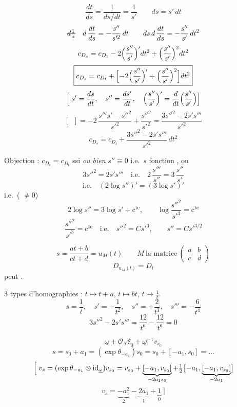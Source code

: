 \documentclass[11pt,a4paper]{article}
\begin{document}
\[
\frac{dt}{ds}=\frac{1}{ds/dt}=\frac{1}{s'} \qquad ds=s'\,dt
\]
\[
\text{\struck{$d\frac{1}{s}$}}\quad d\,\frac{dt}{ds}=-\frac{s''}{s'^2}\,dt
\qquad ds\,d\,\frac{dt}{ds}=-\frac{s''}{s'}\,dt^2
\]
\[
c_{D_s}=c_{D_t}-2\Bigl(\frac{s''}{s'}\Bigr)'dt^2+\Bigl(\frac{s''}{s'}\Bigr)^2dt^2
\]
\[
\boxed{c_{D_s}=c_{D_t}+\Bigl[-2\Bigl(\frac{s''}{s'}\Bigr)'+\Bigl(\frac{s''}{s'}\Bigr)^2\Bigr]dt^2}
\]
\[
\Bigl[\;s'=\frac{ds}{dt},\quad s''=\frac{ds'}{dt},\quad \Bigl(\frac{s''}{s'}\Bigr)'=\frac{d}{dt}\Bigl(\frac{s''}{s'}\Bigr)\Bigr]
\]
\[
[\;\;]=-2\,\frac{s'''s'-s''^2}{s'^2}+\frac{s''^2}{s'^2}=\frac{3s''^2-2s's'''}{s'^2}
\]
\[
\boxed{c_{D_s}=c_{D_t}+\frac{3s''^2-2s's'''}{s'^2}\,dt^2}
\]

Objection : $c_{D_s}=c_{D_t}$ ssi \emph{ou bien} $s''\equiv0$ i.e.\ $s$ fonction \ill{} , ou
\[
3s''^2=2s's'''\quad\text{i.e.}\quad 2\,\frac{s'''}{s''}=3\,\frac{s''}{s'}
\]
\[
\text{i.e.}\quad (2\log s'')'=(3\log s')'
\]
i.e.\ ( $\neq0$)
\[
2\log s''=3\log s'+\mathrm{c}^{\mathrm{te}},\qquad \log\frac{s''^2}{s'^3}=\mathrm{c}^{\mathrm{te}}
\]
\[
\frac{s''^2}{s'^3}=\mathrm{c}^{\mathrm{te}}\quad\text{i.e.}\quad s''^2=Cs'^3,\qquad s''=Cs'^{3/2}
\]

\[
s=\frac{at+b}{ct+d}=u_M(t)\qquad M\ \text{la matrice}\ \begin{pmatrix}a&b\\c&d\end{pmatrix}
\]
\[
D_{u_M(t)}=D_t
\]
\struck{\ill{}}  peut  \ill{}.

$3$ types d'homographies : $t\mapsto t+a$, $t\mapsto bt$, $t\mapsto\frac{1}{t}$.
\[
s=\frac1t,\quad s'=-\frac{1}{t^2},\quad s''=+\frac{2}{t^3},\quad s'''=-\frac{6}{t^4}
\]
\[
3s''^2-2s's'''=\frac{12}{t^6}-\frac{12}{t^6}=0
\]

\[
\underline{\omega}+\mathcal{O}_X\xi_0+\underline{\omega}^{-1}v_{s_0}
\]
\[
s=s_0+a_1=(\exp\theta_{-a_1})s_0=s_0+[-a_1,s_0]=\dots
\]
\[
\Bigl[\;v_s=(\exp\theta_{-a_1}\otimes\mathrm{id}_{\underline{\omega}})v_{s_0}
=v_{s_0}+\underbrace{[-a_1,v_{s_0}]}_{-2a_1 s_0}+\tfrac12\bigl[-a_1,\underbrace{[-a_1,v_{s_0}]}_{-2a_1}\bigr]
\]
\[
v_s=\underbrace{-a_1^2}_{2}-\underbrace{2a_1}_{1}+\underbrace{1}_{0}\;\Bigr]
\]
\end{document}
